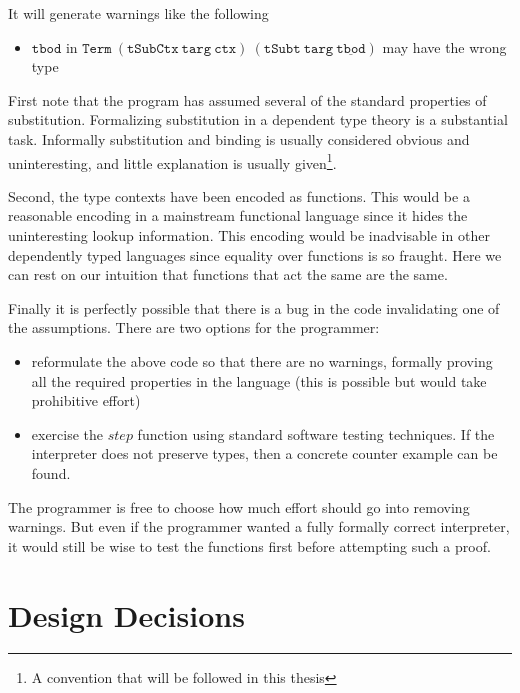 It will generate warnings like the following
\begin{itemize}
\item $\mathtt{tbod}$ in $\mathtt{Term\ (tSubCtx\ targ\ ctx)\ (tSubt\ targ\ \underline{tbod})}$
may have the wrong type
\end{itemize}
First note that the program has assumed several of the standard properties of substitution.
Formalizing substitution in a dependent type theory is a substantial
task\cite{10.1145/3293880.3294101}.
Informally substitution and binding is usually considered obvious and uninteresting, and little explanation is usually given\footnote{A convention that will be followed in this thesis}.

Second, the type contexts have been encoded as functions.
This would be a reasonable encoding in a mainstream functional language since it hides the uninteresting lookup information.
This encoding would be inadvisable in other dependently typed languages since equality over functions is so fraught.
Here we can rest on our intuition that functions that act the same are the same.

Finally it is perfectly possible that there is a bug in the code invalidating one of the assumptions.
There are two options for the programmer:
\begin{itemize}
\item reformulate the above code so that there are no warnings, formally proving all the required properties in the language (this is possible but would take prohibitive effort)
\item exercise the $step$ function using standard software testing techniques.
If the interpreter does not preserve types, then a concrete counter example can be found.
\end{itemize}
The programmer is free to choose how much effort should go into removing warnings.
But even if the programmer wanted a fully formally correct interpreter, it would still be wise to test the functions first before attempting such a proof.



\section{Design Decisions}

